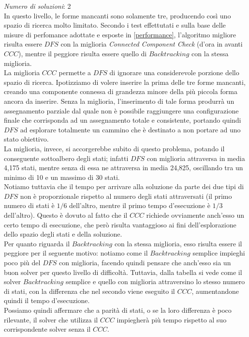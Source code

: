 \textit{Numero di soluzioni}: 2\\

In questo livello, le forme mancanti sono solamente tre, producendo così uno spazio di ricerca molto limitato. Secondo i test effettutati e sulla base delle misure di perfomance adottate e esposte in \ref{performance}, l'algoritmo migliore risulta essere $DFS$ con la miglioria \textit{Connected Component Check} (d'ora in avanti $CCC$), mentre il peggiore risulta essere quello di $Backtracking$ con la stessa miglioria.\\

La miglioria $CCC$ permette a $DFS$ di ignorare una considerevole porzione dello spazio di ricerca. Ipotizziamo di volere inserire la prima delle tre forme mancanti, creando una componente connessa di grandezza minore della più piccola forma ancora da inserire. Senza la miglioria, l'inserimento di tale forma produrrà un assegnamento parziale dal quale non è possibile raggiungere una configurazione finale che corrisponda ad un assegnamento totale e consistente, portando quindi $DFS$ ad esplorare totalmente un cammino che è destinato a non portare ad uno stato obiettivo.\\
La miglioria, invece, si accorgerebbe subito di questo problema, potando il conseguente sottoalbero degli stati; infatti $DFS$ con miglioria attraversa in media 4,175 stati, mentre senza di essa ne attraversa in media 24,825, oscillando tra un minimo di 10 e un massimo di 30 stati.\\
Notiamo tuttavia che il tempo per arrivare alla soluzione da parte dei due tipi di $DFS$ non è proporzionale rispetto al numero degli stati attraversati (il primo numero di stati è $1/6$ dell'altro, mentre il primo tempo d'esecuzione è $1/3$ dell'altro). Questo è dovuto al fatto che il $CCC$ richiede ovviamente anch'esso un certo tempo di esecuzione, che però risulta vantaggioso ai fini dell'esplorazione dello spazio degli stati e della soluzione.\\

Per quanto riguarda il $Backtracking$ con la stessa miglioria, esso risulta essere il peggiore per il seguente motivo: notiamo come il $Backtracking$ semplice impieghi poco più del $DFS$ con miglioria, facendo quindi pensare che anch'esso sia un buon solver per questo livello di difficoltà. Tuttavia, dalla tabella si vede come il solver $Backtracking$ semplice e quello con miglioria attraversino lo stesso numero di stati, con la differenza che nel secondo viene eseguito il $CCC$, aumentandone quindi il tempo d'esecuzione.\\
Possiamo quindi affermare che a parità di stati, o se la loro differenza è poco rilevante, il solver che utilizza il $CCC$ impiegherà più tempo rispetto al suo corrispondente solver senza il $CCC$.\\


